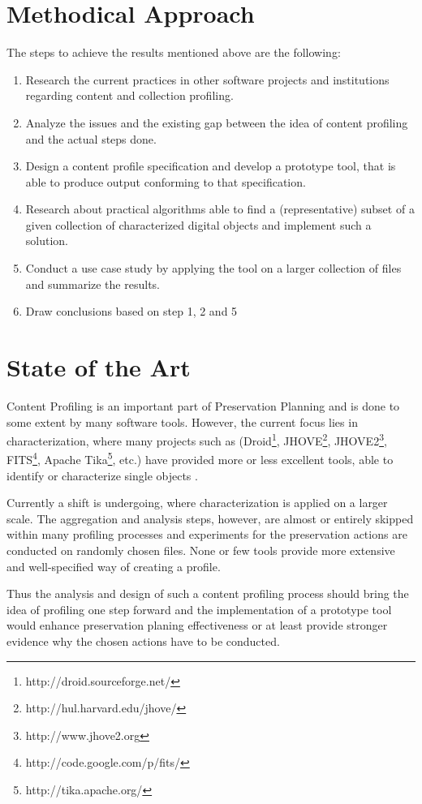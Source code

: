 \documentclass[a4paper,12pt]{scrartcl} %
\begin{document}
\section*{Methodical Approach}
The steps to achieve the results mentioned above are the following:
\begin{enumerate}[itemsep=2pt, parsep=2pt]
\item Research the current practices in other software projects and institutions regarding content and collection profiling.
\item Analyze the issues and the existing gap between the idea of content profiling and the actual steps done.
\item Design a content profile specification and develop a prototype tool, that is able to produce output conforming to that specification.
\item Research about practical algorithms able to find a (representative) subset of a given collection of characterized digital objects and implement such a solution.
\item Conduct a use case study by applying the tool on a larger collection of files and summarize the results.
\item Draw conclusions based on step 1, 2 and 5
\end{enumerate}

\section*{State of the Art}
Content Profiling is an important part of Preservation Planning and is done to some extent by many software tools. However, the current focus lies in characterization, where many projects such as (Droid\footnote{http://droid.sourceforge.net/}, JHOVE\footnote{http://hul.harvard.edu/jhove/}, JHOVE2\footnote{http://www.jhove2.org}, FITS\footnote{http://code.google.com/p/fits/}, Apache Tika\footnote{http://tika.apache.org/}, etc.) have provided more or less excellent tools, able to identify or characterize single objects \cite{Knijff:2011it}. 

Currently a shift is undergoing, where characterization is applied on a larger scale. The aggregation and analysis steps, however, are almost or entirely skipped within many profiling processes and experiments for the preservation actions are conducted on randomly chosen files. None or few tools provide more extensive and well-specified way of creating a profile.

Thus the analysis and design of such a content profiling process should bring the idea of profiling one step forward and the implementation of a prototype tool would enhance preservation planing effectiveness or at least provide stronger evidence why the chosen actions have to be conducted.



\end{document}
